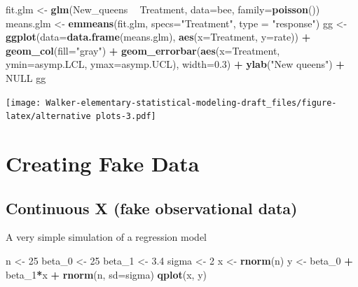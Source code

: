 \documentclass[]{book}
\newenvironment{Shaded}{\begin{snugshade}}{\end{snugshade}}
\newcommand{\KeywordTok}[1]{\textcolor[rgb]{0.13,0.29,0.53}{\textbf{#1}}}
\newcommand{\DataTypeTok}[1]{\textcolor[rgb]{0.13,0.29,0.53}{#1}}
\newcommand{\DecValTok}[1]{\textcolor[rgb]{0.00,0.00,0.81}{#1}}
\newcommand{\FloatTok}[1]{\textcolor[rgb]{0.00,0.00,0.81}{#1}}
\newcommand{\StringTok}[1]{\textcolor[rgb]{0.31,0.60,0.02}{#1}}
\newcommand{\OtherTok}[1]{\textcolor[rgb]{0.56,0.35,0.01}{#1}}
\newcommand{\OperatorTok}[1]{\textcolor[rgb]{0.81,0.36,0.00}{\textbf{#1}}}
\newcommand{\NormalTok}[1]{#1}
\theoremstyle{definition}
\theoremstyle{definition}
\theoremstyle{definition}
\theoremstyle{remark}
\begin{document}
\begin{Shaded}
\begin{Highlighting}[]
\NormalTok{fit.glm <-}\StringTok{ }\KeywordTok{glm}\NormalTok{(New_queens }\OperatorTok{~}\StringTok{ }\NormalTok{Treatment, }\DataTypeTok{data=}\NormalTok{bee, }\DataTypeTok{family=}\KeywordTok{poisson}\NormalTok{())}
\NormalTok{means.glm <-}\StringTok{ }\KeywordTok{emmeans}\NormalTok{(fit.glm, }\DataTypeTok{specs=}\StringTok{"Treatment"}\NormalTok{, }\DataTypeTok{type =} \StringTok{"response"}\NormalTok{)}
\NormalTok{gg <-}\StringTok{ }\KeywordTok{ggplot}\NormalTok{(}\DataTypeTok{data=}\KeywordTok{data.frame}\NormalTok{(means.glm), }\KeywordTok{aes}\NormalTok{(}\DataTypeTok{x=}\NormalTok{Treatment, }\DataTypeTok{y=}\NormalTok{rate)) }\OperatorTok{+}
\StringTok{  }\KeywordTok{geom_col}\NormalTok{(}\DataTypeTok{fill=}\StringTok{"gray"}\NormalTok{) }\OperatorTok{+}\StringTok{ }
\StringTok{  }\KeywordTok{geom_errorbar}\NormalTok{(}\KeywordTok{aes}\NormalTok{(}\DataTypeTok{x=}\NormalTok{Treatment, }\DataTypeTok{ymin=}\NormalTok{asymp.LCL, }\DataTypeTok{ymax=}\NormalTok{asymp.UCL), }\DataTypeTok{width=}\FloatTok{0.3}\NormalTok{) }\OperatorTok{+}
\StringTok{  }\KeywordTok{ylab}\NormalTok{(}\StringTok{"New queens"}\NormalTok{) }\OperatorTok{+}
\StringTok{  }\OtherTok{NULL}
\NormalTok{gg}
\end{Highlighting}
\end{Shaded}

\texttt{[image: Walker-elementary-statistical-modeling-draft\_files/figure-latex/alternative plots-3.pdf]}

\section{Creating Fake Data}\label{creating-fake-data}

\subsection{Continuous X (fake observational
data)}\label{continuous-x-fake-observational-data}

A very simple simulation of a regression model

\begin{Shaded}
\begin{Highlighting}[]
\NormalTok{n <-}\StringTok{ }\DecValTok{25}
\NormalTok{beta_}\DecValTok{0}\NormalTok{ <-}\StringTok{ }\DecValTok{25}
\NormalTok{beta_}\DecValTok{1}\NormalTok{ <-}\StringTok{ }\FloatTok{3.4}
\NormalTok{sigma <-}\StringTok{ }\DecValTok{2}
\NormalTok{x <-}\StringTok{ }\KeywordTok{rnorm}\NormalTok{(n)}
\NormalTok{y <-}\StringTok{ }\NormalTok{beta_}\DecValTok{0} \OperatorTok{+}\StringTok{ }\NormalTok{beta_}\DecValTok{1}\OperatorTok{*}\NormalTok{x }\OperatorTok{+}\StringTok{ }\KeywordTok{rnorm}\NormalTok{(n, }\DataTypeTok{sd=}\NormalTok{sigma)}
\KeywordTok{qplot}\NormalTok{(x, y)}
\end{Highlighting}
\end{Shaded}
\end{document}
